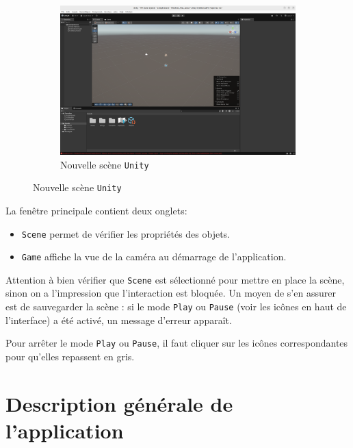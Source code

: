 \documentclass[a4paper,10pt]{article}
\newenvironment{solution}%
{\begin{tcolorbox}[breakable,colback=red!5!white,colframe=red!75!black,title=Solution]}%
{\end{tcolorbox}}
\begin{document}
\begin{figure}[h]
	\begin{subfigure}{\textwidth}
		\begin{center}
			\includegraphics[width=.8\textwidth]{fig/new-Unity-scene}
			\caption{Nouvelle scène \texttt{Unity}}
			\label{fig:new-Unity-scene}
		\end{center}
	\end{subfigure}
\end{figure}

\fi 

\ifversionenseignant
\begin{solution}
La fenêtre principale contient deux onglets:
\begin{itemize}
	\item \texttt{Scene} permet de vérifier les propriétés des objets. 
	\item \texttt{Game} affiche la vue de la caméra au démarrage de l'application.	
\end{itemize} 

Attention à bien vérifier que \texttt{Scene} est sélectionné pour mettre en place la scène, sinon on a l'impression que l'interaction est bloquée. Un moyen de s'en assurer est de sauvegarder la scène : si le mode \texttt{Play} ou \texttt{Pause} (voir les icônes en haut de l'interface) a été activé, un message d'erreur apparaît.

Pour arrêter le mode \texttt{Play} ou \texttt{Pause}, il faut cliquer sur les icônes correspondantes pour qu'elles repassent en gris.
\end{solution}
\fi 


\section{Description générale de l'application}
\end{document}
